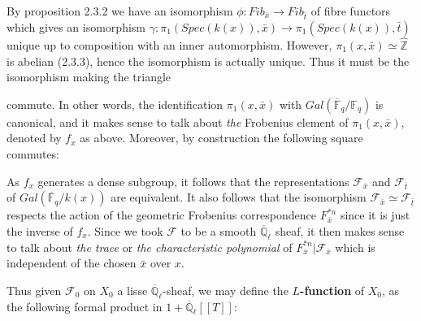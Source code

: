 \documentclass{ucbthesis}
\theoremstyle{definition}
\theoremstyle{theorem}
\begin{document}
By proposition 2.3.2 we have an isomorphism $\phi:Fib_{\bar{x}}\rightarrow Fib_{\bar{t}}$ of fibre functors  which gives an isomorphism
 $\gamma:\pi_{1}(Spec(k(x)),\bar{x})\rightarrow \pi_{1}(Spec(k(x)),\bar{t})$ unique up to composition with an inner automorphism.
  However,   $\pi_{1}(x,\bar{x})\simeq \hat{\mathbb{Z}}$ is abelian (2.3.3), hence the isomorphism is actually
   unique. Thus it must be the isomorphism making the triangle
\begin{center}
\end{center}
commute. In other words, the identification $\pi_{1}(x,\bar{x})$ with $Gal(\overline{\mathbb{F}}_{q}/\mathbb{F}_{q})$ is canonical, and it makes sense to talk about \emph{the} Frobenius element of $\pi_{1}(x,\bar{x})$, denoted by $f_{x}$ as above. Moreover, by construction the following square commutes:
\begin{center}
\end{center} 

As $f_{x}$ generates a dense subgroup, it follows that the representations $\mathcal{F}_{\bar{x}}$ and $\mathcal{F}_{\bar{t}}$ of $Gal(\overline{\mathbb{F}}_{q}/k(x))$ are equivalent. It also follows that the isomorphism $\mathcal{F}_{\bar{x}} \simeq \mathcal{F}_{\bar{t}}$ respects the action of the geometric Frobenius correspondence $F^{*n}_{\bar{x}}$ since it is just the inverse of $f_{x}$. Since we took $\mathcal{F}$ to be a smooth $\overline{\mathbb{Q}}_{\ell}$ sheaf, it then makes sense to talk about \emph{the trace} or \emph{the characteristic polynomial} of $F_{\bar{x}}^{*n}|\mathcal{F}_{\bar{x}}$ which is independent of the chosen $\bar{x}$ over $x$.

Thus given $\mathcal{F}_{0}$ on $X_{0}$ a lisse $\overline{\mathbb{Q}}_\ell$-sheaf, we may define the $L$\textbf{-function} of $X_{0}$, as the following formal product in $1+\overline{\mathbb{Q}}_{\ell}[[T]]$:
\end{document}
